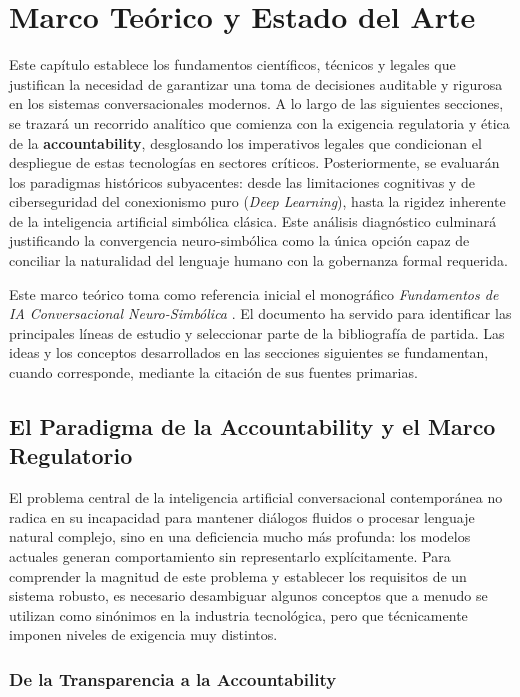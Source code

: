 \documentclass[12pt,a4paper]{report}
\begin{document}
\chapter{Marco Teórico y Estado del Arte}

Este capítulo establece los fundamentos científicos, técnicos y legales que justifican la necesidad de garantizar una toma de decisiones auditable y rigurosa en los sistemas conversacionales modernos. A lo largo de las siguientes secciones, se trazará un recorrido analítico que comienza con la exigencia regulatoria y ética de la \textbf{accountability}, desglosando los imperativos legales que condicionan el despliegue de estas tecnologías en sectores críticos. Posteriormente, se evaluarán los paradigmas históricos subyacentes: desde las limitaciones cognitivas y de ciberseguridad del conexionismo puro (\textit{Deep Learning}), hasta la rigidez inherente de la inteligencia artificial simbólica clásica. Este análisis diagnóstico culminará justificando la convergencia neuro-simbólica como la única opción capaz de conciliar la naturalidad del lenguaje humano con la gobernanza formal requerida.

Este marco teórico toma como referencia inicial el monográfico \textit{Fundamentos de IA Conversacional Neuro-Simbólica} \cite{acai2026fundamentos}. El documento ha servido para identificar las principales líneas de estudio y seleccionar parte de la bibliografía de partida. Las ideas y los conceptos desarrollados en las secciones siguientes se fundamentan, cuando corresponde, mediante la citación de sus fuentes primarias.

\section{El Paradigma de la Accountability y el Marco Regulatorio}

El problema central de la inteligencia artificial conversacional contemporánea no radica en su incapacidad para mantener diálogos fluidos o procesar lenguaje natural complejo, sino en una deficiencia mucho más profunda: los modelos actuales generan comportamiento sin representarlo explícitamente. Para comprender la magnitud de este problema y establecer los requisitos de un sistema robusto, es necesario desambiguar algunos conceptos que a menudo se utilizan como sinónimos en la industria tecnológica, pero que técnicamente imponen niveles de exigencia muy distintos.

\subsection{De la Transparencia a la Accountability}
\end{document}
